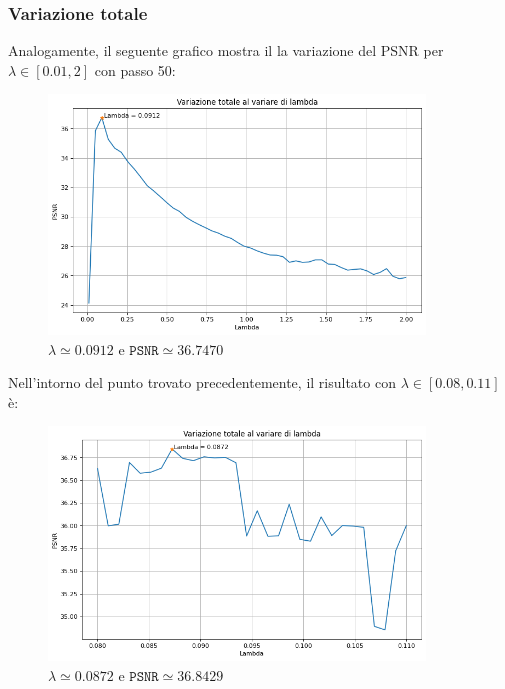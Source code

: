 \documentclass[11pt]{article}
\begin{document}
\subsubsection*{Variazione totale}
Analogamente, il seguente grafico mostra il la variazione del PSNR per $\lambda \in [0.01, 2]$ con passo 50:
\begin{figure}[H]
    \centering
    \includegraphics[width=10cm]{tv_lambda1.png}
    \caption{$\lambda \simeq 0.0912$ e $\texttt{PSNR} \simeq 36.7470$}
    \label{fig:tv_lambda1}
\end{figure}
Nell'intorno del punto trovato precedentemente, il risultato con $\lambda \in [0.08, 0.11]$ è:
\begin{figure}[H]
    \centering
    \includegraphics[width=10cm]{tv_lambda2.png}
    \caption{$\lambda \simeq 0.0872$ e $\texttt{PSNR} \simeq 36.8429$}
    \label{fig:tv_lambda2}
\end{figure}
\end{document}
